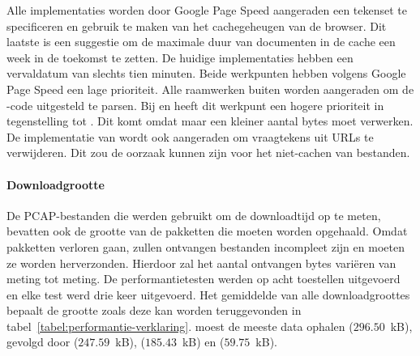 Alle implementaties worden door Google Page Speed aangeraden een tekenset te specificeren en gebruik te maken van het cachegeheugen van de browser.
Dit laatste is een suggestie om de maximale duur van documenten in de cache een week in de toekomst te zetten.
De huidige implementaties hebben een vervaldatum van slechts tien minuten.
Beide werkpunten hebben volgens Google Page Speed een lage prioriteit.
Alle raamwerken buiten \st{} worden aangeraden om de \js-code uitgesteld te parsen.
Bij \kendo{} en \jqm{} heeft dit werkpunt een hogere prioriteit in tegenstelling tot \lungo{}.
Dit komt omdat \lungo{} maar een kleiner aantal bytes moet verwerken.
De implementatie van \st{} wordt ook aangeraden om vraagtekens uit URLs te verwijderen.
Dit zou de oorzaak kunnen zijn voor het niet-cachen van bestanden.

\paragraph{Downloadgrootte}
De PCAP-bestanden die werden gebruikt om de downloadtijd op te meten, bevatten ook de grootte van de pakketten die moeten worden opgehaald.
Omdat pakketten verloren gaan, zullen ontvangen bestanden incompleet zijn en moeten ze worden herverzonden.
Hierdoor zal het aantal ontvangen bytes variëren van meting tot meting.
De performantietesten werden op acht toestellen uitgevoerd en elke test werd drie keer uitgevoerd.
Het gemiddelde van alle downloadgroottes bepaalt de grootte zoals deze kan worden teruggevonden in tabel~\ref{tabel:performantie-verklaring}.
\kendo{} moest de meeste data ophalen ($296.50$~kB),  gevolgd door \st{} ($247.59$~kB), \jqm{} ($185.43$~kB) en \lungo{} ($59.75$~kB).